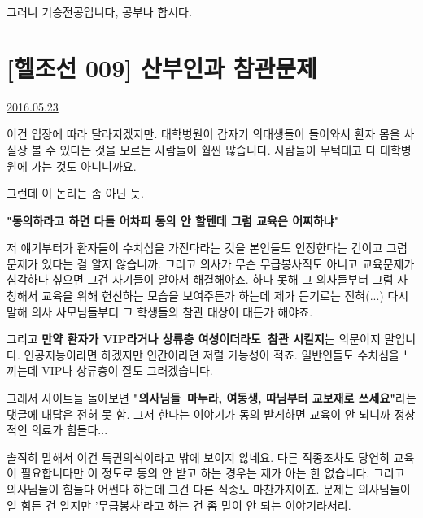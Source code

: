 그러니 기승전공입니다, 공부나 합시다.
\vspace{5mm}








\section{[헬조선 009] 산부인과 참관문제}
\href{https://www.kockoc.com/Apoc/788842}{2016.05.23}

\vspace{5mm}

이건 입장에 따라 달라지겠지만.
대학병원이 갑자기 의대생들이 들어와서 환자 몸을 사실상 볼 수 있다는 것을 모르는 사람들이 훨씬 많습니다.
사람들이 무턱대고 다 대학병원에 가는 것도 아니니까요.
\vspace{5mm}

그런데 이 논리는 좀 아닌 듯.
\vspace{5mm}

\textbf{"동의하라고 하면 다들 어차피 동의 안 할텐데 그럼 교육은 어찌하냐"}
\vspace{5mm}

저 얘기부터가 환자들이 수치심을 가진다라는 것을 본인들도 인정한다는 건이고 그럼 문제가 있다는 걸 알지 않습니까.
그리고 의사가 무슨 무급봉사직도 아니고 교육문제가 심각하다 싶으면 그건 자기들이 알아서 해결해야죠.
하다 못해 그 의사들부터 그럼 자청해서 교육을 위해 헌신하는 모습을 보여주든가 하는데 제가 듣기로는 전혀(...)
다시 말해 의사 사모님들부터 그 학생들의 참관 대상이 대든가 해야죠.
\vspace{5mm}

그리고 \textbf{만약 환자가 VIP라거나 상류층 여성이더라도 참관 시킬지}는 의문이지 말입니다.
인공지능이라면 하겠지만 인간이라면 저럴 가능성이 적죠. 일반인들도 수치심을 느끼는데 VIP나 상류층이 잘도 그러겠습니다.
\vspace{5mm}

그래서 사이트들 돌아보면 \textbf{"의사님들 마누라, 여동생, 따님부터 교보재로 쓰세요"}라는 댓글에 대답은 전혀 못 함.
그저 한다는 이야기가 동의 받게하면 교육이 안 되니까 정상적인 의료가 힘들다...
\vspace{5mm}

솔직히 말해서 이건 특권의식이라고 밖에 보이지 않네요.
다른 직종조차도 당연히 교육이 필요합니다만 이 정도로 동의 안 받고 하는 경우는 제가 아는 한 없습니다.
그리고 의사님들이 힘들다 어쩐다 하는데 그건 다른 직종도 마찬가지이죠.
문제는 의사님들이 일 힘든 건 알지만 '무급봉사'라고 하는 건 좀 말이 안 되는 이야기라서리.
\vspace{5mm}

